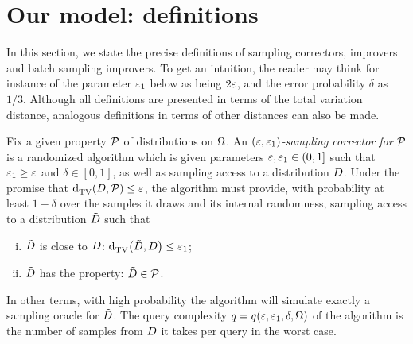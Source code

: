 

\section{Our model: definitions}\label{sec:definitions}
	In this section, we state the precise definitions of sampling correctors, improvers and batch sampling improvers. 
To get an intuition, 
the reader may think for instance of the parameter $\varepsilon_1$ below as being $2\varepsilon$, 
and the error probability $\delta$ as $1/3$.
Although all definitions are presented in terms of the total variation
distance, analogous definitions in terms of other distances can also be made.

\begin{definition}\label{def:sampling:corrector}
  Fix a given property $\mathcal{P}$ of distributions on ${\Omega}$. 
An \emph{$(\varepsilon,\varepsilon_1)$-sampling corrector for $\mathcal{P}$} is a randomized algorithm which is given parameters $\varepsilon, \varepsilon_1\in(0,1]$ such that $\varepsilon_1 \geq \varepsilon$ and $\delta\in[0,1]$, as well as sampling access to a distribution $D$. Under the promise that ${\operatorname{d}_{\textrm{TV}}^{}\!\left({D, \mathcal{P}}\right)}\leq \varepsilon$, the algorithm must provide, with probability at least $1-\delta$ over the samples it draws and its internal randomness, sampling access to a distribution $\tilde{D}$ such that
  \begin{enumerate}[(i)]
    \item $\tilde{D}$ is close to $D$: ${\operatorname{d}_{\textrm{TV}}^{}\!\left({\tilde{D}, D}\right)} \leq \varepsilon_1$;
    \item $\tilde{D}$ has the property: $\tilde{D}\in \mathcal{P}$.
  \end{enumerate}
  In other terms, with high probability the {algorithm}   will simulate exactly a sampling oracle for $\tilde{D}$. The query complexity $q=q(\varepsilon,\varepsilon_1,\delta,{\Omega})$ of the algorithm is the number of samples from $D$ it takes per query in the worst case.
\end{definition}

